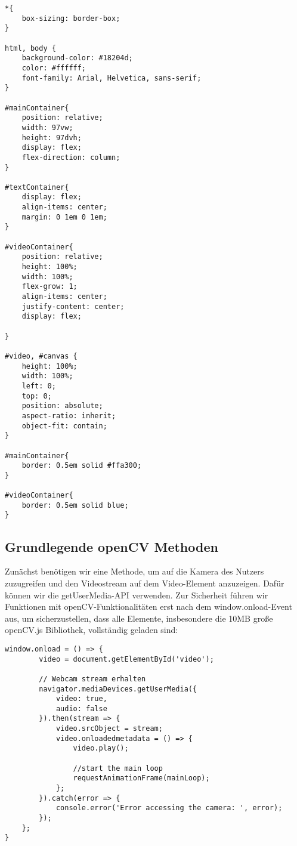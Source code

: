 \begin{lstlisting}[style=CSS]
*{
    box-sizing: border-box;
}

html, body {
    background-color: #18204d;
    color: #ffffff;
    font-family: Arial, Helvetica, sans-serif;
}

#mainContainer{
    position: relative;
    width: 97vw;
    height: 97dvh;
    display: flex;
    flex-direction: column;
}

#textContainer{
    display: flex;
    align-items: center;
    margin: 0 1em 0 1em;
}

#videoContainer{
    position: relative;
    height: 100%;
    width: 100%;
    flex-grow: 1;
    align-items: center;
    justify-content: center;
    display: flex;

}

#video, #canvas {
    height: 100%;
    width: 100%;
    left: 0;
    top: 0;
    position: absolute;
    aspect-ratio: inherit;
    object-fit: contain;
}

#mainContainer{
    border: 0.5em solid #ffa300;
}

#videoContainer{
    border: 0.5em solid blue;
}
\end{lstlisting}

\subsection{Grundlegende openCV Methoden}
Zunächst benötigen wir eine Methode, um auf die Kamera des Nutzers zuzugreifen und den Videostream auf dem Video-Element anzuzeigen. Dafür können wir die getUserMedia-API verwenden. Zur Sicherheit führen wir Funktionen mit openCV-Funktionalitäten erst nach dem window.onload-Event aus, um sicherzustellen, dass alle Elemente, insbesondere die 10MB große openCV.js Bibliothek, vollständig geladen sind:

\begin{lstlisting}[style=JavaScript]
    window.onload = () => {
        video = document.getElementById('video');
    
        // Webcam stream erhalten
        navigator.mediaDevices.getUserMedia({
            video: true,
            audio: false
        }).then(stream => {
            video.srcObject = stream;
            video.onloadedmetadata = () => {
                video.play();

                //start the main loop
                requestAnimationFrame(mainLoop);
            };
        }).catch(error => {
            console.error('Error accessing the camera: ', error);
        });
    };
}
\end{lstlisting}

